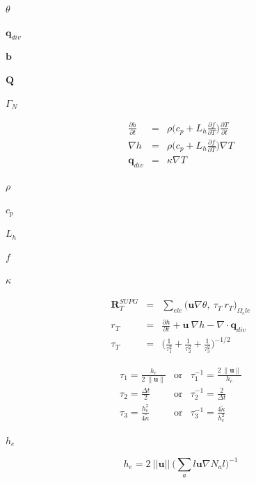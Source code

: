 \documentclass{article}
\begin{document}
$ \theta $
\pagebreak

$ \mathbf{q}_{div} $
\pagebreak

$ \mathbf{b} $
\pagebreak

$ \mathbf{Q} $
\pagebreak

$ \Gamma_N $
\pagebreak

\[
\begin{eqnarray}
\frac{\partial h}{\partial t} & = & \rho \bigg( c_p + L_h \frac{\partial f}{\partial T} \bigg) \frac{\partial T}{\partial t} \\
\nabla h                 & = & \rho \bigg( c_p + L_h \frac{\partial f}{\partial T} \bigg) \nabla T \\
\mathbf{q}_{div}         & = & \kappa \nabla T
\end{eqnarray}
\]
\pagebreak

$ \rho $
\pagebreak

$ c_p $
\pagebreak

$ L_h $
\pagebreak

$ f $
\pagebreak

$ \kappa $
\pagebreak

\[
\begin{array}{lll}
\mathbf{R}_{T}^{SUPG} & = & \displaystyle \sum_{ele} {
 \bigg( \mathbf{u} \nabla \theta,\ \tau_{T} \  r_T \bigg)_{\Omega_ele}}\\[15pt]
 
 r_T & = & \displaystyle  \frac{\partial h}{\partial t} + \mathbf{u}\ \nabla h  - \nabla \cdot \mathbf{q}_{div} \\[15pt] 
 
 \tau_T & = & \displaystyle \bigg( \frac{1}{\tau_1^2} + \frac{1}{\tau_2^2} + \frac{1}{\tau_3^2} \bigg)^{-1/2} 
\end{array}
\]
\pagebreak

\[ 
\begin{array}{lll}
 \tau_1  = \frac{h_e}{2\ \| \mathbf{u} \|} & \textrm{or} &  \tau_1^{-1}  = \frac{2\ \| \mathbf{u} \|}{h_e} \\
 \tau_2  = \frac{\Delta t}{2}              & \textrm{or} &  \tau_2^{-1}  = \frac{2}{\Delta t}               \\
 \tau_3  = \frac{h_e^2}{4 \tilde{\kappa}}  & \textrm{or} &  \tau_3^{-1}  = \frac{4 \tilde{\kappa}}{h_e^2}
\end{array}
\]
\pagebreak

$ h_e $
\pagebreak

\[  h_e =  2\ || \mathbf{u} ||\ \bigg( \sum_a l \mathbf{u} \nabla N_a l \bigg)^{-1} \]
\pagebreak
\end{document}
